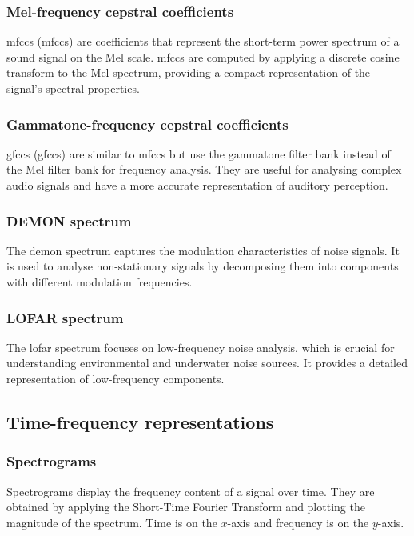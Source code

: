 \subsubsection{Mel-frequency cepstral coefficients}
\acrlong{mfcc}s (\acrshort{mfcc}s) are coefficients that represent the short-term power spectrum of a sound signal on the Mel scale. \acrshort{mfcc}s are computed by applying a discrete cosine transform to the Mel spectrum, providing a compact representation of the signal's spectral properties.

\subsubsection{Gammatone-frequency cepstral coefficients}
\acrlong{gfcc}s (\acrshort{gfcc}s) are similar to \acrshort{mfcc}s but use the gammatone filter bank instead of the Mel filter bank for frequency analysis. They are useful for analysing complex audio signals and have a more accurate representation of auditory perception.

\subsubsection{DEMON spectrum}
The \acrfull{demon} spectrum captures the modulation characteristics of noise signals. It is used to analyse non-stationary signals by decomposing them into components with different modulation frequencies.

\subsubsection{LOFAR spectrum}
The \acrfull{lofar} spectrum focuses on low-frequency noise analysis, which is crucial for understanding environmental and underwater noise sources. It provides a detailed representation of low-frequency components.

\subsection{Time-frequency representations}

\subsubsection{Spectrograms}
Spectrograms display the frequency content of a signal over time. They are obtained by applying the Short-Time Fourier Transform and plotting the magnitude of the spectrum. Time is on the $x$-axis and frequency is on the $y$-axis.

